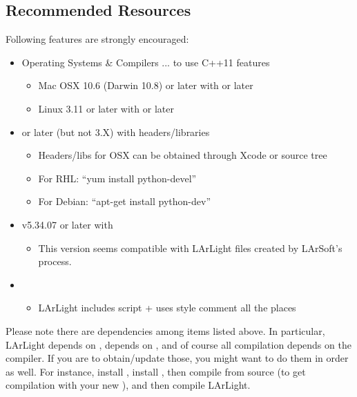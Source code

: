 \subsection{Recommended Resources}
Following features are strongly encouraged:
\begin{itemize}
    \item Operating Systems \& Compilers ... to use {\ttfamily C++11} features
      \begin{itemize}
          \item Mac OSX 10.6 (Darwin 10.8) or later with  or later
          \item Linux 3.11 or later with  or later
      \end{itemize}

    \item {} or later (but not 3.X) with headers/libraries
      \begin{itemize}
          \item Headers/libs for OSX can be obtained through Xcode or source tree
          \item For RHL: ``{\ttfamily yum install python-devel}'' 
          \item For Debian: ``{\ttfamily apt-get install python-dev}''
      \end{itemize}

    \item \ROOT v5.34.07 or later with \PyROOT
      \begin{itemize}
          \item This version seems compatible with LArLight files created by LArSoft's \ROOT process.
      \end{itemize}

    \item \doxygen
      \begin{itemize}
          \item LArLight includes \doxygen script + uses \doxygen style comment all the places
      \end{itemize}

\end{itemize}

Please note there are dependencies among items listed above.
In particular, LArLight depends on \ROOT, \PyROOT depends on \python, and of course all compilation depends on the compiler.
If you are to obtain/update those, you might want to do them in order as well. For instance, install \clang, install , then compile \ROOT from source (to get \PyROOT compilation with your new \python), and then compile LArLight.

